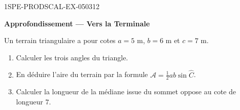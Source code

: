 \begin{exercice}{1SPE-PRODSCAL-EX-050}{3}{12}
\begin{center}\textbf{Approfondissement — Vers la Terminale}\end{center}
Un terrain triangulaire a pour cotes $a = 5$ m, $b = 6$ m et $c = 7$ m.
\begin{enumerate}
  \item Calculer les trois angles du triangle.
  \item En déduire l'aire du terrain par la formule $\mathcal{A} = \frac{1}{2}ab\sin\widehat{C}$.
  \item Calculer la longueur de la médiane issue du sommet oppose au cote de longueur $7$.
\end{enumerate}
\end{exercice}
